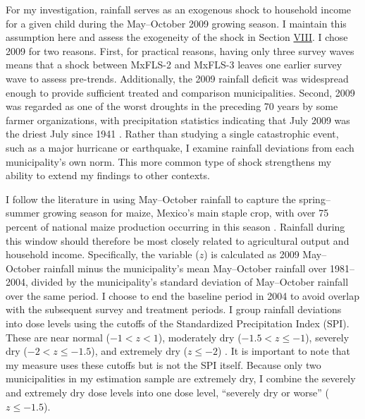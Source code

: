 For my investigation, rainfall serves as an exogenous shock to household income for a given child during the May--October 2009 growing season. I maintain this assumption here and assess the exogeneity of the shock in Section \hyperref[sec:VIII]{VIII}. I chose 2009 for two reasons. First, for practical reasons, having only three survey waves means that a shock between MxFLS-2 and MxFLS-3 leaves one earlier survey wave to assess pre-trends. Additionally, the 2009 rainfall deficit was widespread enough to provide sufficient treated and comparison municipalities. Second, 2009 was regarded as one of the worst droughts in the preceding 70 years by some farmer organizations, with precipitation statistics indicating that July 2009 was the driest July since 1941 \parencite{davydova-belitskayaMexico2010}. Rather than studying a single catastrophic event, such as a major hurricane or earthquake, I examine rainfall deviations from each municipality's own norm. This more common type of shock strengthens my ability to extend my findings to other contexts.

I follow the literature in using May--October rainfall to capture the spring--summer growing season for maize, Mexico's main staple crop, with over 75 percent of national maize production occurring in this season \parencite{jessoeClimateChangeLabour2018}. Rainfall during this window should therefore be most closely related to agricultural output and household income. Specifically, the variable ($z$) is calculated as 2009 May--October rainfall minus the municipality's mean May--October rainfall over 1981--2004, divided by the municipality's standard deviation of May--October rainfall over the same period. I choose to end the baseline period in 2004 to avoid overlap with the subsequent survey and treatment periods. I group rainfall deviations into dose levels using the cutoffs of the Standardized Precipitation Index (SPI). These are near normal ($-1 < z < 1$), moderately dry ($-1.5 < z \le -1$), severely dry ($-2 < z \le -1.5$), and extremely dry ($z \le -2$) \parencite{mckeeRelationshipDroughtFrequency1993,wmoStandardizedPrecipitationIndex2012}. It is important to note that my measure uses these cutoffs but is not the SPI itself. Because only two municipalities in my estimation sample are extremely dry, I combine the severely and extremely dry dose levels into one dose level, ``severely dry or worse'' ($z \le -1.5$).


